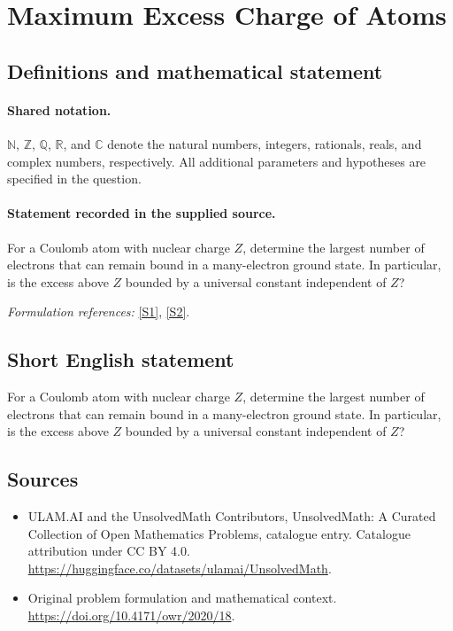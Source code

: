 \documentclass[11pt]{article}
\newcommand{\sref}[2]{\hyperlink{source:#1:#2}{[S#2]}}
\begin{document}
\section{Maximum Excess Charge of Atoms}\label{statement}

\subsection{Definitions and mathematical statement}

\paragraph{Shared notation.}$\mathbb N$, $\mathbb Z$, $\mathbb Q$, $\mathbb R$, and $\mathbb C$ denote the natural numbers, integers, rationals, reals, and complex numbers, respectively. All additional parameters and hypotheses are specified in the question.


\paragraph{Statement recorded in the supplied source.}
For a Coulomb atom with nuclear charge $Z$, determine the largest number of electrons that can remain bound in a many-electron ground state. In particular, is the excess above $Z$ bounded by a universal constant independent of $Z$?
\par\smallskip\textit{Formulation references:} \sref{statement}{1}, \sref{statement}{2}.
\subsection{Short English statement}
For a Coulomb atom with nuclear charge $Z$, determine the largest number of electrons that can remain bound in a many-electron ground state. In particular, is the excess above $Z$ bounded by a universal constant independent of $Z$?
\subsection{Sources}
\begin{itemize}
\item[\hypertarget{source:statement:1}{S1}] ULAM.AI and the UnsolvedMath Contributors, UnsolvedMath: A Curated Collection of Open Mathematics Problems, catalogue entry. Catalogue attribution under CC BY 4.0.
\url{https://huggingface.co/datasets/ulamai/UnsolvedMath}.
\item[\hypertarget{source:statement:2}{S2}] Original problem formulation and mathematical context.
\url{https://doi.org/10.4171/owr/2020/18}.
\end{itemize}
\label{end:statement}
\end{document}
